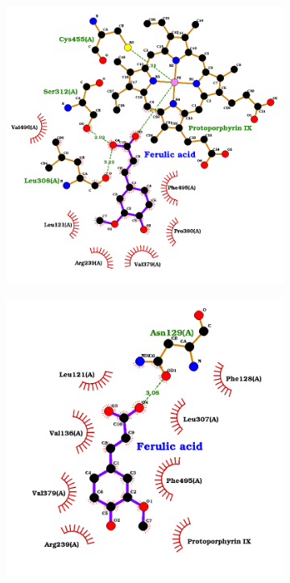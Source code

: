 \documentclass[12pt]{article}
\begin{document}
	\FloatBarrier
	\begin{figure}[h!]
		\centering
		\begin{subfigure}[h!]{0.35\textwidth}
			\hspace{2cm}
			\includegraphics[width=\textwidth]{../5/known/Dock/Dock2/best.png}
			\caption{}
		\end{subfigure}
		\hfill
		\begin{subfigure}[h!]{0.35\textwidth}
			\hspace{-2cm}
			\includegraphics[width=\textwidth]{../5/known/Dock/Dock2/best2.png}

\end{subfigure}
\end{figure}
\end{document}
